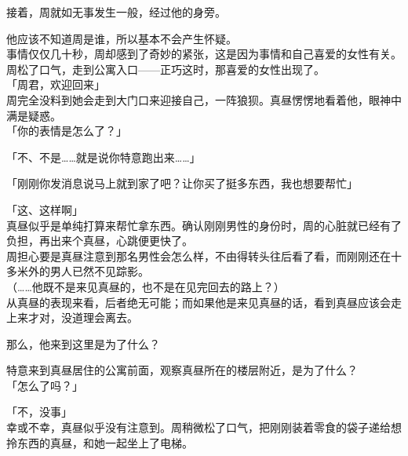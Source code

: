 接着，周就如无事发生一般，经过他的身旁。

他应该不知道周是谁，所以基本不会产生怀疑。\\

事情仅仅几十秒，周却感到了奇妙的紧张，这是因为事情和自己喜爱的女性有关。\\

周松了口气，走到公寓入口——正巧这时，那喜爱的女性出现了。\\

「周君，欢迎回来」\\

周完全没料到她会走到大门口来迎接自己，一阵狼狈。真昼愣愣地看着他，眼神中满是疑惑。\\

「你的表情是怎么了？」

「不、不是……就是说你特意跑出来……」

「刚刚你发消息说马上就到家了吧？让你买了挺多东西，我也想要帮忙」

「这、这样啊」\\

真昼似乎是单纯打算来帮忙拿东西。确认刚刚男性的身份时，周的心脏就已经有了负担，再出来个真昼，心跳便更快了。\\

周担心要是真昼注意到那名男性会怎么样，不由得转头往后看了看，而刚刚还在十多米外的男人已然不见踪影。\\

（……他既不是来见真昼的，也不是在见完回去的路上？）\\

从真昼的表现来看，后者绝无可能；而如果他是来见真昼的话，看到真昼应该会走上来才对，没道理会离去。

那么，他来到这里是为了什么？

特意来到真昼居住的公寓前面，观察真昼所在的楼层附近，是为了什么？\\

「怎么了吗？」

「不，没事」\\

幸或不幸，真昼似乎没有注意到。周稍微松了口气，把刚刚装着零食的袋子递给想拎东西的真昼，和她一起坐上了电梯。
